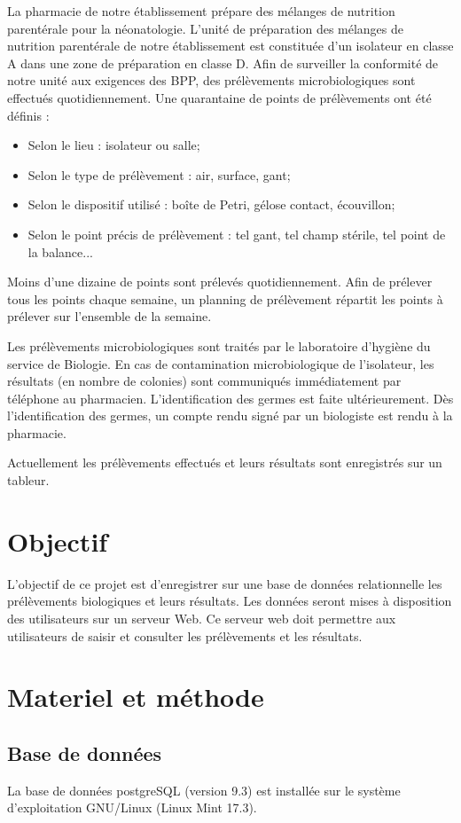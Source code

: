 \documentclass[12pt,a4paper,oneside]{article}
\begin{document}
La pharmacie de notre établissement prépare des mélanges de nutrition parentérale pour la néonatologie. L'unité de préparation des mélanges de nutrition parentérale de notre établissement est constituée d'un isolateur en classe A dans une zone de préparation en classe D. Afin de surveiller la conformité de notre unité aux exigences des BPP, des prélèvements microbiologiques sont effectués quotidiennement. Une quarantaine de points de prélèvements ont été définis :
\begin{itemize}
 \item Selon le lieu : isolateur ou salle;
 \item Selon le type de prélèvement : air, surface, gant;
 \item Selon le dispositif utilisé : boîte de Petri, gélose contact, écouvillon;
 \item Selon le point précis de prélèvement : tel gant, tel champ stérile, tel point de la balance...
 \end{itemize}
Moins d'une dizaine de points sont prélevés quotidiennement. Afin de prélever tous les points chaque semaine, un planning de prélèvement répartit les points à prélever sur l'ensemble de la semaine.

Les prélèvements microbiologiques sont traités par le laboratoire d'hygiène du service de Biologie. En cas de contamination microbiologique de l'isolateur, les résultats (en nombre de colonies) sont communiqués immédiatement par téléphone au pharmacien. L'identification des germes est faite ultérieurement. Dès l'identification des germes, un compte rendu signé par un biologiste est rendu à la pharmacie.

Actuellement les prélèvements effectués et leurs résultats sont enregistrés sur un tableur.
\section{Objectif}
L'objectif de ce projet est d'enregistrer sur une base de données relationnelle les prélèvements biologiques et leurs résultats. Les données seront mises à disposition des utilisateurs sur un serveur Web. Ce serveur web doit permettre aux utilisateurs de saisir et consulter les prélèvements et les résultats.
\section{Materiel et méthode}

\subsection{Base de données}
La base de données postgreSQL (version 9.3) est installée sur le système d'exploitation GNU/Linux (Linux Mint 17.3).
\end{document}

